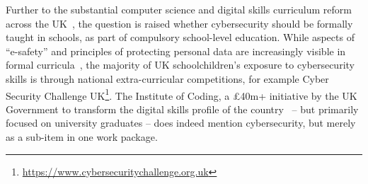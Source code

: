 \documentclass[conference]{IEEEtran}
\begin{document}
Further to the substantial computer science and digital skills curriculum reform across the UK~\cite{crick+sentance:2011,wgictreview:2013,brown-et-al:toce2014,tryfonas+crick:petra2018}, the question is raised whether cybersecurity should be formally taught in schools, as part of compulsory school-level education. While aspects of ``e-safety'' and principles of protecting personal data are increasingly visible in formal curricula~\cite{moller+crick:jce2018}, the majority of UK schoolchildren's exposure to cybersecurity skills is through national extra-curricular competitions, for example Cyber Security Challenge UK\footnote{\url{https://www.cybersecuritychallenge.org.uk}}. The Institute of Coding, a \pounds40m+ initiative by the UK Government to transform the digital skills profile of the country~\cite{Davenportetal2019a} -- but primarily focused on university graduates -- does indeed mention cybersecurity, but merely as a sub-item in one work package.



\end{document}
